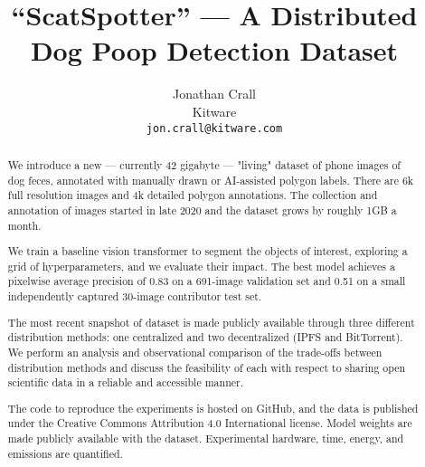 \documentclass[10pt,twocolumn,letterpaper]{article}
\begin{document}
\title{``ScatSpotter'' --- A Distributed Dog Poop Detection Dataset}

\author{Jonathan Crall\\
Kitware\\
{\tt\small jon.crall@kitware.com}
}
\maketitle

\begin{abstract}

We introduce a new --- currently 42 gigabyte --- "living" dataset of phone images of dog feces, annotated with manually drawn or AI-assisted polygon labels. There are 6k full resolution images and 4k detailed polygon annotations. The collection and annotation of images started in late 2020 and the dataset grows by roughly 1GB a month. 

We train a baseline vision transformer to segment the objects of interest, exploring a grid of hyperparameters, and we evaluate their impact.  The best model achieves a pixelwise average precision of 0.83 on a 691-image validation set and 0.51 on a small independently captured 30-image contributor test set.

The most recent snapshot of dataset is made publicly available through three different distribution methods: one centralized and two decentralized (IPFS and BitTorrent).  We perform an analysis and observational comparison of the trade-offs between distribution methods and discuss the feasibility of each with respect to sharing open scientific data in a reliable and accessible manner.

The code to reproduce the experiments is hosted on GitHub, and the data is published under the Creative Commons Attribution 4.0 International license.  Model weights are made publicly available with the dataset. Experimental hardware, time, energy, and emissions are quantified.

\end{abstract}
\end{document}
